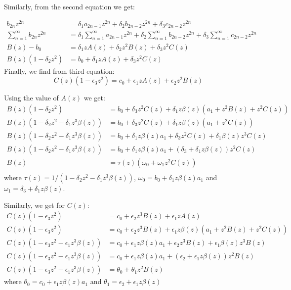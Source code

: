 \documentclass[11pt,a4paper]{article}
\begin{document}
Similarly, from the second equation we get:


\begin{align}
b_{2n}  z^{2n}&= \delta_1 a_{2n-1} z^{2n} + \delta_2 b_{2n-2} z^{2n} +  \delta_3 c_{2n-2} z^{2n}\\
\sum_{n=1}^{\infty} b_{2n}  z^{2n}&=\delta_1   \sum_{n=1}^{\infty}a_{2n-1} z^{2n} + \delta_2  \sum_{n=1}^{\infty}  b_{2n-2} z^{2n} +  \delta_3 \sum_{n=1}^{\infty}c_{2n-2} z^{2n}\\
B(z) -b_0 &=\delta_1  z A(z) + \delta_2 z^2 B(z) + \delta_3 z^2 C(z)\\
B(z)(1 - \delta_2 z^2 )  &=  b_0 + \delta_1  z A(z) +  \delta_3 z^2 C(z)
\end{align}
Finally, we find from third equation:
\begin{equation}
C(z)(1 - \epsilon_3 z^2 )  =  c_0 + \epsilon_1  z A(z) +  \epsilon_2 z^2 B(z)
\end{equation}

Using the value of $A(z)$ we get:
\begin{align*}
B(z)(1 - \delta_2 z^2 )  &=  b_0 + \delta_3 z^2 C(z) +  \delta_1  z   \beta(z) (a_1  +  z^2 B(z) + z^2 C(z)) \\
B(z)(1 - \delta_2 z^2 -\delta_1  z^3   \beta(z) )  &=  b_0 + \delta_3 z^2 C(z) +  \delta_1  z   \beta(z)  (a_1  +   z^2 C(z)) \\
B(z)(1 - \delta_2 z^2 -\delta_1  z^3   \beta(z) )  &=  b_0 +  \delta_1  z   \beta(z)  a_1 + \delta_3 z^2 C(z) +  \delta_1     \beta(z)   z^3 C(z) \\
B(z)(1 - \delta_2 z^2 -\delta_1  z^3   \beta(z) )  &=  b_0 +  \delta_1  z   \beta(z)  a_1 + (\delta_3 +  \delta_1 z     \beta(z) )  z^2 C(z) \\
B(z)  &=  \tau(z) ( \omega_0+    \omega_1 z^2 C(z) )\\
\end{align*}
where $\tau(z) = 1/ (1 - \delta_2 z^2 -\delta_1  z^3   \beta(z) )$,  $\omega_0= b_0 +  \delta_1  z   \beta(z)  a_1 $ and $\omega_1= \delta_3 +  \delta_1  z    \beta(z) $.

Similarly, we get for $C(z)$:
\begin{align*}
C(z)(1 - \epsilon_3 z^2 ) & =  c_0 +   \epsilon_2 z^3 B(z) + \epsilon_1  z A(z)\\
C(z)(1 - \epsilon_3 z^2 )  &=  c_0 +   \epsilon_2 z^3 B(z) + \epsilon_1  z \beta(z) (a_1  +  z^2 B(z) + z^2 C(z))\\
C(z)(1 - \epsilon_3 z^2 - \epsilon_1  z^3   \beta(z))  &=  c_0 +  \epsilon_1  z \beta(z) a_1+  \epsilon_2 z^3 B(z) + \epsilon_1   \beta(z) z^3 B(z) \\
C(z)(1 - \epsilon_3 z^2 - \epsilon_1  z^3   \beta(z))  &=  c_0 +  \epsilon_1  z \beta(z) a_1+  (\epsilon_2 + \epsilon_1  z \beta(z)) z^2 B(z)\\
C(z)(1 - \epsilon_3 z^2 - \epsilon_1  z^3   \beta(z))  &=  \theta_0+ \theta_1  z^2 B(z)
\end{align*}
where $\theta_0= c_0 +  \epsilon_1  z \beta(z) a_1$ and $\theta_1= \epsilon_2 + \epsilon_1   z \beta(z)$
\end{document}
